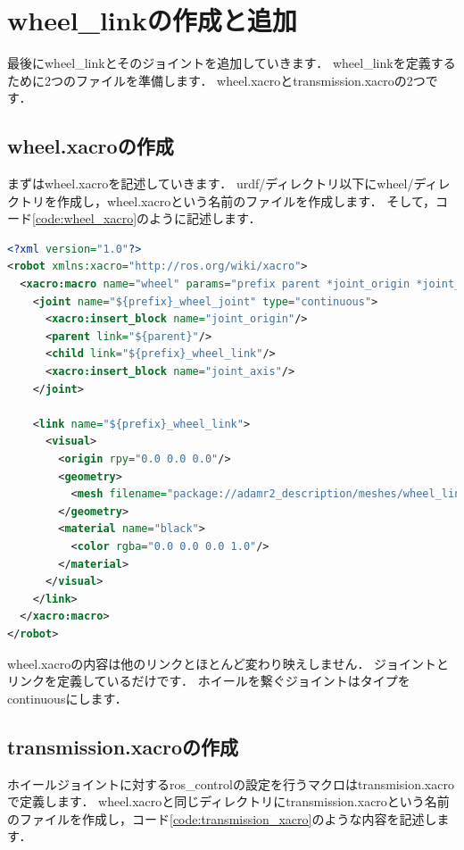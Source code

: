 \documentclass[{../../master}]{subfiles}
\begin{document}
\section{\textsf{wheel\_link}の作成と追加}
\label{sec:add_wheel_link}

最後に\textsf{wheel\_link}とそのジョイントを追加していきます．
\textsf{wheel\_link}を定義するために2つのファイルを準備します．
\textsf{wheel.xacro}と\textsf{transmission.xacro}の2つです．

\subsection{\textsf{wheel.xacro}の作成}

まずは\textsf{wheel.xacro}を記述していきます．
\textsf{urdf/}ディレクトリ以下に\textsf{wheel/}ディレクトリを作成し，\textsf{wheel.xacro}という名前のファイルを作成します．
そして，コード\ref{code:wheel_xacro}のように記述します．

\begin{lstlisting}[language=XML, label=code:wheel_xacro, caption=\textsf{wheel.xacro}]
<?xml version="1.0"?>
<robot xmlns:xacro="http://ros.org/wiki/xacro">
  <xacro:macro name="wheel" params="prefix parent *joint_origin *joint_axis">
    <joint name="${prefix}_wheel_joint" type="continuous">
      <xacro:insert_block name="joint_origin"/>
      <parent link="${parent}"/>
      <child link="${prefix}_wheel_link"/>
      <xacro:insert_block name="joint_axis"/>
    </joint>
    
    <link name="${prefix}_wheel_link">
      <visual>
        <origin rpy="0.0 0.0 0.0"/>
        <geometry>
          <mesh filename="package://adamr2_description/meshes/wheel_link.STL"/>
        </geometry>
        <material name="black">
          <color rgba="0.0 0.0 0.0 1.0"/>
        </material>
      </visual>
    </link>
  </xacro:macro>
</robot>
\end{lstlisting}

\textsf{wheel.xacro}の内容は他のリンクとほとんど変わり映えしません．
ジョイントとリンクを定義しているだけです．
ホイールを繋ぐジョイントはタイプを\textsf{continuous}にします．

\subsection{\textsf{transmission.xacro}の作成}

ホイールジョイントに対する\textsf{ros\_control}の設定を行うマクロは\textsf{transmision.xacro}で定義します．
\textsf{wheel.xacro}と同じディレクトリに\textsf{transmission.xacro}という名前のファイルを作成し，コード\ref{code:transmission_xacro}のような内容を記述します．
\end{document}
